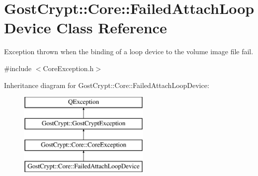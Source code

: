 \hypertarget{class_gost_crypt_1_1_core_1_1_failed_attach_loop_device}{}\section{Gost\+Crypt\+:\+:Core\+:\+:Failed\+Attach\+Loop\+Device Class Reference}
\label{class_gost_crypt_1_1_core_1_1_failed_attach_loop_device}


Exception thrown when the binding of a loop device to the volume image file fail.  




{\ttfamily \#include $<$Core\+Exception.\+h$>$}

Inheritance diagram for Gost\+Crypt\+:\+:Core\+:\+:Failed\+Attach\+Loop\+Device\+:\begin{figure}[H]
\begin{center}
\leavevmode
\includegraphics[height=4.000000cm]{class_gost_crypt_1_1_core_1_1_failed_attach_loop_device}
\end{center}
\end{figure}
